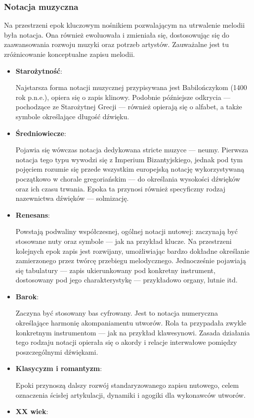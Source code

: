 \subsubsection{Notacja muzyczna}
Na przestrzeni epok kluczowym nośnikiem pozwalającym na utrwalenie melodii była notacja.
Ona również ewoluowała i zmieniała się, dostosowując się do zaawansowania rozwoju muzyki oraz potrzeb artystów.
Zauważalne jest tu zróżnicowanie konceptualne zapisu melodii.
\begin{itemize}
	\item \textbf{Starożytność}:

	      Najstarsza forma notacji muzycznej przypisywana jest Babilończykom (1400 rok p.n.e.), opiera się o zapis klinowy.
	      Podobnie późniejsze odkrycia — pochodzące ze Starożytnej Grecji — również opierają się o alfabet,
	      a także symbole określające długość dźwięku.
	\item \textbf{Średniowiecze}:

	      Pojawia się wówczas notacja dedykowana stricte muzyce — neumy. Pierwsza notacja tego typu wywodzi się z Imperium Bizantyjskiego,
	      jednak pod tym pojęciem rozumie się przede wszystkim europejską notację wykorzystywaną początkowo w chorale
	      gregoriańskim — do określania wysokości dźwięków oraz ich czasu trwania.
	      Epoka ta przynosi również specyficzny rodzaj nazewnictwa dźwięków — solmizację.
	\item \textbf{Renesans}:

	      Powstają podwaliny współczesnej, ogólnej notacji nutowej: zaczynają być stosowane nuty oraz symbole
	      — jak na przykład klucze.
	      Na przestrzeni kolejnych epok zapis jest rozwijany, umożliwiając bardzo dokładne określanie zamierzonego przez twórcę przebiegu
	      melodycznego.
	      Jednocześnie pojawiają się tabulatury — zapis ukierunkowany pod konkretny instrument, dostosowany pod jego charakterystykę —
	      przykładowo organy, lutnie itd.
	\item \textbf{Barok}:

	      Zaczyna być stosowany bas cyfrowany.
	      Jest to notacja numeryczna określające harmonię akompaniamentu utworów.
	      Rola ta przypadała zwykle konkretnym instrumentom — jak na przykład klawesynowi.
	      Zasada działania tego rodzaju notacji opierała się o akordy i relacje interwałowe pomiędzy poszczególnymi dźwiękami.
	\item \textbf{Klasycyzm i romantyzm}:

	      Epoki przynoszą dalszy rozwój standaryzowanego zapisu nutowego, celem oznaczenia ścisłej artykulacji, dynamiki i agogiki
	      dla wykonawców utworów.
	\item \textbf{XX wiek}:


\end{itemize}
